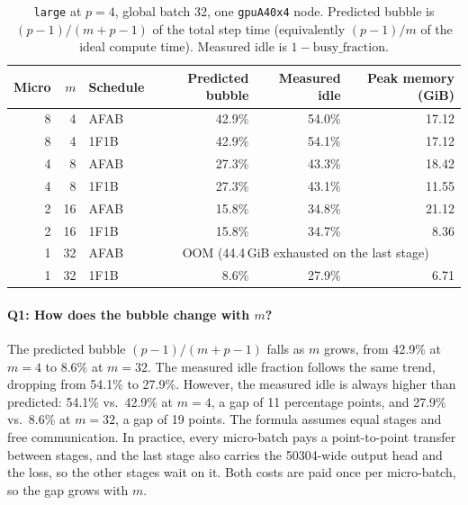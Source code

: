 \documentclass[10pt]{article}
\begin{document}
\begin{table}[htbp]
\caption{\texttt{large} at $p=4$, global batch 32, one \texttt{gpuA40x4}
node. Predicted bubble is $(p-1)/(m+p-1)$ of the total step time
(equivalently $(p-1)/m$ of the ideal compute time). Measured idle is
$1-\text{busy\_fraction}$.}
\label{tab:pp}
\centering
\begin{tabular}{rrlrrr}
\toprule
Micro & $m$ & Schedule & Predicted bubble & Measured idle & Peak memory (GiB) \\
\midrule
8 & 4  & AFAB & 42.9\% & 54.0\% & 17.12 \\
8 & 4  & 1F1B & 42.9\% & 54.1\% & 17.12 \\
4 & 8  & AFAB & 27.3\% & 43.3\% & 18.42 \\
4 & 8  & 1F1B & 27.3\% & 43.1\% & 11.55 \\
2 & 16 & AFAB & 15.8\% & 34.8\% & 21.12 \\
2 & 16 & 1F1B & 15.8\% & 34.7\% & 8.36  \\
1 & 32 & AFAB & \multicolumn{3}{c}{OOM (44.4\,GiB exhausted on the last stage)} \\
1 & 32 & 1F1B & 8.6\%  & 27.9\% & 6.71  \\
\bottomrule
\end{tabular}
\end{table}

\paragraph{Q1: How does the bubble change with $m$?}
The predicted bubble $(p-1)/(m+p-1)$ falls as $m$ grows, from 42.9\% at
$m=4$ to 8.6\% at $m=32$. The measured idle fraction follows the same
trend, dropping from 54.1\% to 27.9\%.
However, the measured idle is always higher than predicted: 54.1\% vs.\
42.9\% at $m=4$, a gap of 11 percentage points, and 27.9\% vs.\ 8.6\% at
$m=32$, a gap of 19 points. The formula assumes
equal stages and free communication. In practice, every micro-batch pays a
point-to-point transfer between stages, and the last stage also carries the
50304-wide output head and the loss, so the other stages wait on it. Both
costs are paid once per micro-batch, so the gap grows with $m$.
\end{document}

